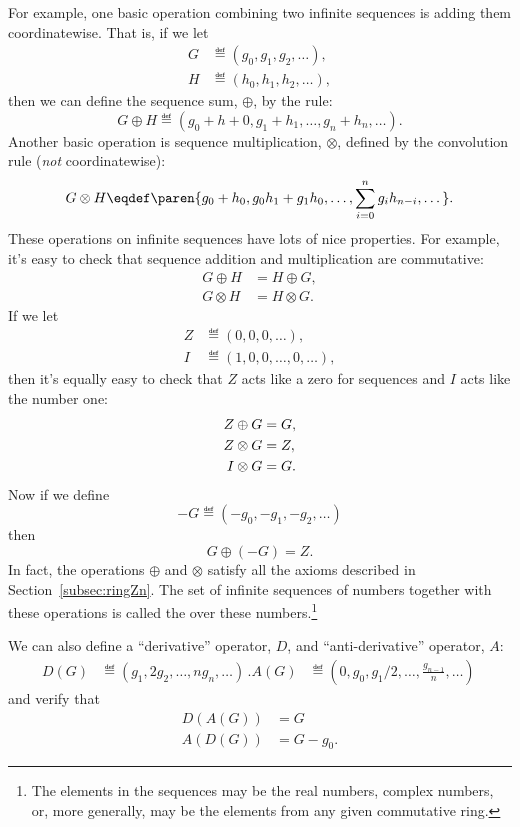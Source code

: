 For example, one basic operation combining two infinite sequences is
adding them coordinatewise.  That is, if we let
\begin{align*}
G & \eqdef (g_0,g_1,g_2,\dots),\\
H & \eqdef (h_0,h_1,h_2,\dots),
\end{align*}
then we can define the sequence sum, $\oplus$, by the rule:
\[
G \oplus H \eqdef (g_0+h+0, g_1+h_1, \dots, g_n+h_n, \dots).
\]
Another basic operation is sequence multiplication, $\otimes$, defined
by the convolution rule (\emph{not} coordinatewise):
\[
G \otimes H \eqdef \paren{g_0+h_0, g_0h_1+g_1h_0, \dots, \sum_{i=0}^n g_ih_{n-i}, \dots}.
\]
These operations on infinite sequences have lots of nice properties.
For example, it's easy to check that sequence addition and
multiplication are commutative:
\begin{align*}
G \oplus H & = H \oplus G,\\
G \otimes H & = H \otimes G.
\end{align*}
If we let
\begin{align*}
Z & \eqdef (0,0,0,\dots),\\
I & \eqdef (1,0,0,\dots,0,\dots),
\end{align*}
then it's equally easy to check that $Z$ acts like a zero for
sequences and $I$ acts like the number one:
\begin{align}
Z \oplus G & = G,\notag\\
Z \otimes G & = Z,\label{ZoGZ}\\
I \otimes G & = G.\notag
\end{align}
Now if we define
\[
-G \eqdef (-g_0, -g_1, -g_2,\dots)
\]
then
\[
G \oplus (-G) = Z.
\]
In fact, the operations $\oplus$ and $\otimes$ satisfy all the
\emph{} axioms described in
Section~\ref{subsec:ringZn}.  The set of infinite sequences of
numbers together with these operations is called the  over these numbers.\footnote{The elements in
  the sequences may be the real numbers, complex numbers, or, more
  generally, may be the elements from any given commutative ring.}

\begin{editingnotes}
We can also define a ``derivative'' operator, $D$, and
``anti-derivative'' operator, $A$:
\begin{align*}
D(G) & \eqdef (g_1, 2g_2, \dots, ng_{n},\dots)\, .
A(G) & \eqdef (0, g_0, g_1/2, \dots, \frac{g_{n-1}}{n}, \dots)\,
\end{align*}
and verify that
\begin{align*}
D(A(G)) & = G\\
A(D(G)) & = G - g_0.
\end{align*}
\end{editingnotes}

